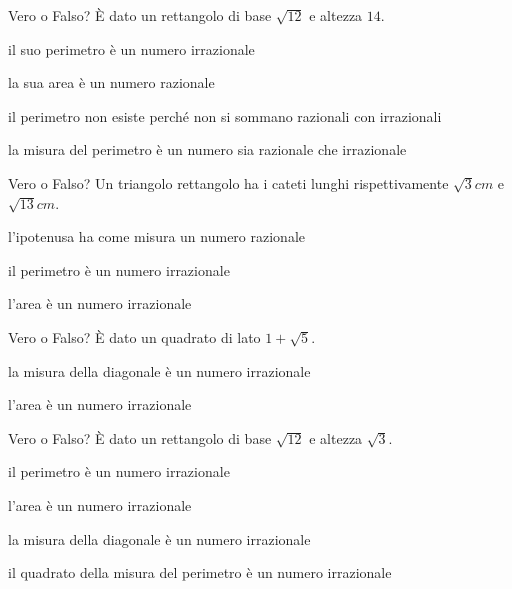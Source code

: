 \begin{esercizio}%
Vero o Falso? È dato un rettangolo di base $\sqrt{12}$ e altezza $14$.

\TabPositions{11.5cm}
 \begin{enumeratea}
 \item il suo perimetro è un numero irrazionale \tab\boxV\quad\boxF
 \item la sua area è un numero razionale \tab\boxV\quad\boxF
 \item il perimetro non esiste perché non si sommano razionali con irrazionali \tab\boxV\quad\boxF
 \item la misura del perimetro è un numero sia razionale che irrazionale \tab\boxV\quad\boxF
 \end{enumeratea}
\end{esercizio}
\pagebreak
\begin{esercizio}%
Vero o Falso? Un triangolo rettangolo ha i cateti lunghi rispettivamente $\sqrt 3\unit{cm}$ e $\sqrt{13}\unit{cm}$.

\TabPositions{11.5cm}
 \begin{enumeratea}
 \item l’ipotenusa ha come misura un numero razionale \tab\boxV\quad\boxF
 \item il perimetro è un numero irrazionale \tab\boxV\quad\boxF
 \item l'area è un numero irrazionale \tab\boxV\quad\boxF
 \end{enumeratea}
\end{esercizio}

\begin{esercizio}%
Vero o Falso? È dato un quadrato di lato $1+\sqrt 5$.

\TabPositions{11.5cm}
 \begin{enumeratea}
 \item la misura della diagonale è un numero irrazionale \tab\boxV\quad\boxF
 \item l'area è un numero irrazionale \tab\boxV\quad\boxF
 \end{enumeratea}
\end{esercizio}

\begin{esercizio}%
Vero o Falso? È dato un rettangolo di base $\sqrt{12}$ e altezza $\sqrt 3$.

\TabPositions{11.5cm}
 \begin{enumeratea}
 \item il perimetro è un numero irrazionale \tab\boxV\quad\boxF
 \item l’area è un numero irrazionale \tab\boxV\quad\boxF
 \item la misura della diagonale è un numero irrazionale \tab\boxV\quad\boxF
 \item il quadrato della misura del perimetro è un numero irrazionale \tab\boxV\quad\boxF
 \end{enumeratea}
\end{esercizio}

